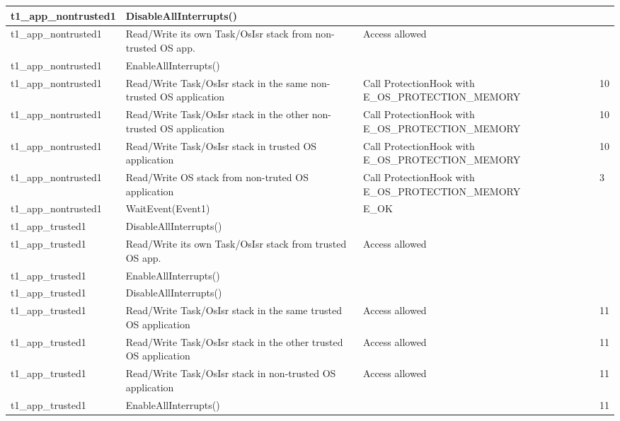 \documentclass[10pt]{article}
\newlength{\Li}\settowidth{\Li}{Running}
\newlength{\Lii}\setlength{\Lii}{7cm}
\newlength{\Liiii}\setlength{\Liiii}{0.9cm}
\newlength{\Liii}\setlength{\Liii}{\textwidth} \addtolength{\Liii}{-\Li} \addtolength{\Liii}{-\Lii} \addtolength{\Liii}{-\Liiii}
\begin{document}
	\begin{supertabular}{|p{\Li}|p{\Lii}|p{\Liii}|p{\Liiii}|} \hline 
	t1\_app\_nontrusted1	& DisableAllInterrupts()								&												& \\ \hline
	t1\_app\_nontrusted1	& Read/Write its own Task/OsIsr stack from non-trusted OS app.	& Access allowed								& \\ \hline
	t1\_app\_nontrusted1	& EnableAllInterrupts()								&												& \\ \hline
	
	t1\_app\_nontrusted1	& Read/Write Task/OsIsr stack in the same non-trusted OS application 	& Call ProtectionHook with E\_OS\_PROTECTION\_MEMORY		& 10 \\ \hline
	t1\_app\_nontrusted1	& Read/Write Task/OsIsr stack in the other non-trusted OS application 	& Call ProtectionHook with E\_OS\_PROTECTION\_MEMORY		& 10 \\ \hline
	t1\_app\_nontrusted1	& Read/Write Task/OsIsr stack in trusted OS application			 	& Call ProtectionHook with E\_OS\_PROTECTION\_MEMORY		& 10 \\ \hline
	t1\_app\_nontrusted1	& Read/Write OS stack from non-truted OS application		& Call ProtectionHook with E\_OS\_PROTECTION\_MEMORY		& 3 \\ \hline
	
	t1\_app\_nontrusted1	& WaitEvent(Event1)									& E\_OK											& \\ \hline
	
	t1\_app\_trusted1	& DisableAllInterrupts()								&												& \\ \hline
	t1\_app\_trusted1	& Read/Write its own Task/OsIsr stack from trusted OS app.	& Access allowed									& \\ \hline
	t1\_app\_trusted1	& EnableAllInterrupts()								&												& \\ \hline
	
	t1\_app\_trusted1	& DisableAllInterrupts()								&												& \\ \hline
	t1\_app\_trusted1	& Read/Write Task/OsIsr stack in the same trusted OS application 	& Access allowed								& 11 \\ \hline
	t1\_app\_trusted1	& Read/Write Task/OsIsr stack in the other trusted OS application 	& Access allowed								& 11 \\ \hline
	t1\_app\_trusted1	& Read/Write Task/OsIsr stack in non-trusted OS application	 	& Access allowed								& 11 \\ \hline
	t1\_app\_trusted1	& EnableAllInterrupts()								&												& 11 \\ \hline


\end{supertabular}
\end{document}
